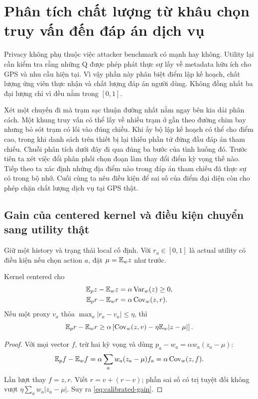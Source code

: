 \section{Phân tích chất lượng từ khâu chọn truy vấn đến đáp án dịch vụ}\label{sec:utility}
Privacy không phụ thuộc việc attacker benchmark có mạnh hay không. Utility lại cần kiểm tra rằng
những Q được phép phát thực sự lấy về metadata hữu ích cho GPS và nhu cầu hiện tại. Vì vậy phần
này phân biệt điểm lập kế hoạch, chất lượng ứng viên thực nhận và chất lượng đáp án người dùng.
Không đồng nhất ba đại lượng chỉ vì đều nằm trong $[0,1]$.

Xét một chuyến đi mà trạm sạc thuận đường nhất nằm ngay bên kia dải phân cách. Một khung truy
vấn có thể lấy về nhiều trạm ở gần theo đường chim bay nhưng bỏ sót trạm có lối vào đúng chiều.
Khi ấy bộ lập kế hoạch có thể cho điểm cao, trong khi danh sách trên thiết bị lại thiếu phần
tử đứng đầu đáp án tham chiếu. Chuỗi phân tích dưới đây đi qua đúng ba bước của tình huống đó.
Trước tiên ta xét việc đổi phân phối chọn đoạn làm thay đổi điểm kỳ vọng thế nào. Tiếp theo ta
xác định những địa điểm nào trong đáp án tham chiếu đã thực sự có trong bộ nhớ. Cuối cùng ta
nêu điều kiện để sai số của điểm đại diện còn cho phép chặn chất lượng dịch vụ tại GPS thật.

\subsection{Gain của centered kernel và điều kiện chuyển sang utility thật}
Giữ một history và trạng thái local cố định. Với $r_a\in[0,1]$ là actual utility có điều kiện nếu
chọn action $a$, đặt $\mu=\mathbb E_w z$ như trước.
\begin{theorem}\label{thm:gain}
Kernel centered cho
\begin{align}
\mathbb E_p z-\mathbb E_w z&=\alpha\operatorname{Var}_w(z)\ge0,\label{eq:score-gain}\\
\mathbb E_p r-\mathbb E_w r&=\alpha\operatorname{Cov}_w(z,r).\label{eq:actual-gain}
\end{align}
Nếu một proxy $v_a$ thỏa $\max_a|r_a-v_a|\le\eta$, thì
\begin{equation}
\mathbb E_p r-\mathbb E_w r\ge
\alpha\left[\operatorname{Cov}_w(z,v)-\eta\mathbb E_w|z-\mu|\right].
\label{eq:calibrated-gain}
\end{equation}
\end{theorem}
\begin{proof}
Với mọi vector $f$, trừ hai kỳ vọng và dùng $p_a-w_a=\alpha w_a(z_a-\mu)$:
\[
\mathbb E_p f-\mathbb E_w f=\alpha\sum_a w_a(z_a-\mu)f_a=\alpha\operatorname{Cov}_w(z,f).
\]
Lần lượt thay $f=z,r$. Viết $r=v+(r-v)$; phần sai số có trị tuyệt đối không vượt
$\eta\sum_aw_a|z_a-\mu|$. Suy ra \eqref{eq:calibrated-gain}.
\end{proof}

